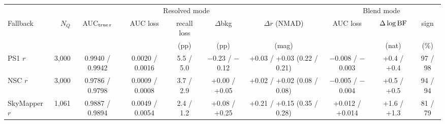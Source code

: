 \begin{tabular}{lrcccccccc}
\hline
& \multicolumn{6}{c}{Resolved mode} & \multicolumn{3}{c}{Blend mode} \\
Fallback & $N_Q$ & AUC$_{\rm true\,r}$ & AUC loss & recall loss & $\Delta$bkg & $\Delta r$ (NMAD) & AUC loss & $\Delta\log{\rm BF}$ & sign \\
& & & & (pp) & (pp) & (mag) & & (nat) & (\%) \\
\hline
PS1 $r$ & 3{,}000 & 0.9940 / 0.9942 & 0.0020 / 0.0016 & 5.5 / 5.0 & $-$0.23 / $-$0.12 & +0.03 / +0.03 (0.22 / 0.21) & $-$0.008 / $-$0.003 & +0.4 / +0.4 & 97 / 98 \\
NSC $r$ & 3{,}000 & 0.9786 / 0.9798 & 0.0009 / 0.0008 & 3.7 / 2.9 & +0.00 / +0.05 & +0.02 / +0.02 (0.08 / 0.08) & $-$0.005 / $-$0.004 & +0.5 / +0.5 & 94 / 94 \\
SkyMapper $r$ & 1{,}061 & 0.9887 / 0.9894 & 0.0049 / 0.0054 & 2.4 / 1.2 & +0.08 / +0.25 & +0.21 / +0.15 (0.35 / 0.28) & +0.012 / +0.014 & +1.6 / +1.3 & 81 / 79 \\
\hline
\end{tabular}
